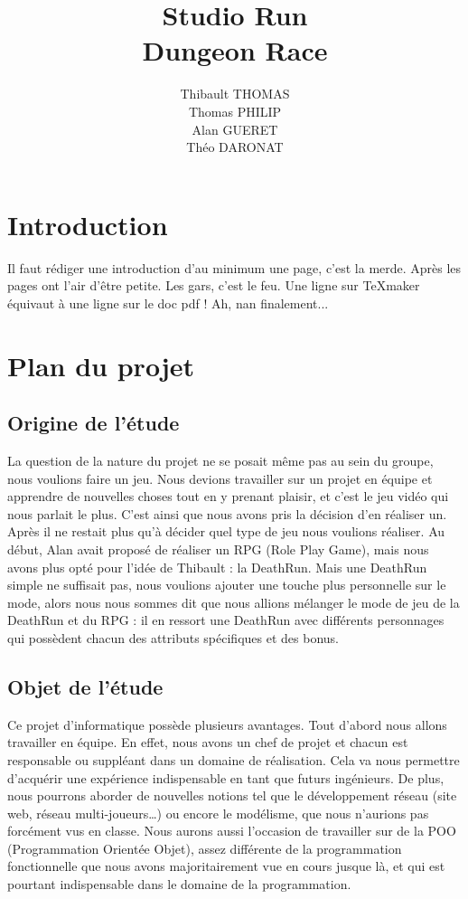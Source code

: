 \documentclass[12pt]{report}
\title{\large Studio Run \\ \normalsize Dungeon Race}
\date{}
\author{Thibault THOMAS \\ Thomas PHILIP \\ Alan GUERET \\ Théo DARONAT}
\begin{document}
\maketitle
\tableofcontents
\pagebreak
\section{Introduction}
Il faut rédiger une introduction d'au minimum une page, c'est la merde. Après les pages ont l'air d'être petite. Les gars, c'est le feu. Une ligne sur TeXmaker équivaut à une ligne sur le doc pdf ! Ah, nan finalement...
\section{Plan du projet}

	\subsection{Origine de l'étude}
	La question de la nature du projet ne se posait même pas au sein du groupe, nous voulions faire un jeu. Nous devions travailler sur un projet en équipe et apprendre de nouvelles choses tout en y prenant plaisir, et c’est le jeu vidéo qui nous parlait le plus. C’est ainsi que nous avons pris la décision d’en réaliser un. Après il ne restait plus qu’à décider quel type de jeu nous voulions réaliser. Au début, Alan avait proposé de réaliser un RPG (Role Play Game), mais nous avons plus opté pour l’idée de Thibault : la DeathRun. Mais une DeathRun simple ne suffisait pas, nous voulions ajouter une touche plus personnelle sur le mode, alors nous nous sommes dit que nous allions mélanger le mode de jeu de la DeathRun et du RPG : il en ressort une DeathRun avec différents personnages qui possèdent chacun des attributs spécifiques et des bonus.
	
	\subsection{Objet de l'étude}
		Ce projet d’informatique possède plusieurs avantages. Tout d’abord nous allons travailler en équipe. En effet, nous avons un chef de projet et chacun est responsable ou suppléant dans un domaine de réalisation. Cela va nous permettre d'acquérir une expérience indispensable en tant que futurs ingénieurs. De plus, nous pourrons aborder de nouvelles notions tel que le développement réseau (site web, réseau multi-joueurs…) ou encore le modélisme, que nous n’aurions pas forcément vus en classe. Nous aurons aussi l’occasion de travailler sur de la POO (Programmation Orientée Objet), assez différente de la programmation fonctionnelle que nous avons majoritairement vue en cours jusque là, et qui est pourtant indispensable dans le domaine de la programmation. 
\end{document}
